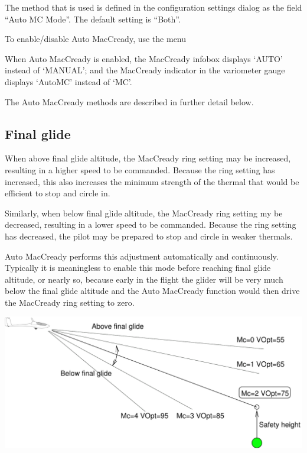 \documentclass[a4paper,12pt]{refrep}
\begin{document}
The method that is used is defined in the configuration settings dialog as the
field ``Auto MC Mode''.  The default setting is ``Both''.

To enable/disable Auto MacCready, use the menu
\begin{quote}
\blink{}
\end{quote}

When Auto MacCready is enabled, the MacCready infobox displays `AUTO'
instead of `MANUAL'; and the MacCready indicator in the variometer
gauge displays `AutoMC' instead of `MC'.

The Auto MacCready methods are described in further detail below.

\subsection*{Final glide}
When above final glide altitude, the MacCready ring setting may be
increased, resulting in a higher speed to be commanded.  Because the
ring setting has increased, this also increases the minimum strength
of the thermal that would be efficient to stop and circle in.

Similarly, when below final glide altitude, the MacCready ring setting
my be decreased, resulting in a lower speed to be commanded.  Because
the ring setting has decreased, the pilot may be prepared to stop and
circle in weaker thermals.

Auto MacCready performs this adjustment automatically and
continuously.  Typically it is meaningless to enable this mode before
reaching final glide altitude, or nearly so, because early in the
flight the glider will be very much below the final glide altitude and
the Auto MacCready function would then drive the MacCready ring
setting to zero.

\begin{maxipage}
\begin{center}
\includegraphics[angle=0,width=0.8\linewidth,keepaspectratio='true']{figures/automc.pdf}
\end{center}
\end{maxipage}
\end{document}
